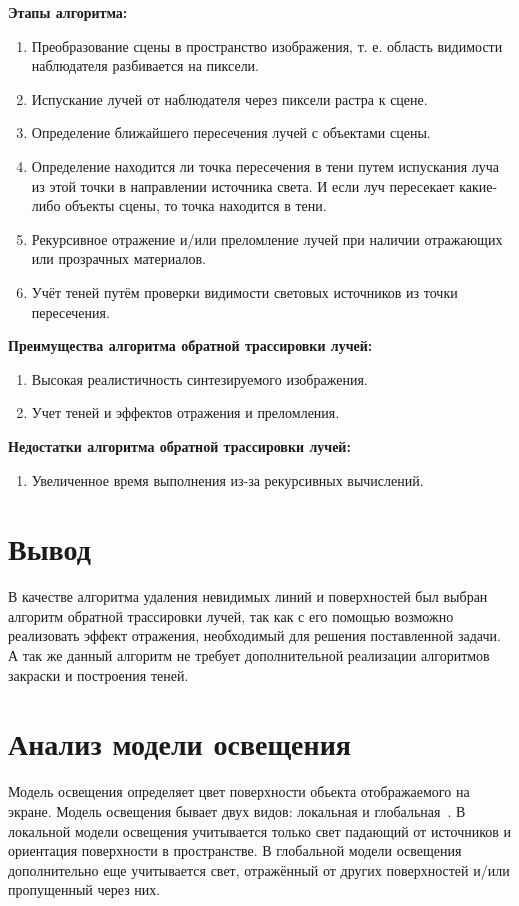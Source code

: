 \textbf{Этапы алгоритма:}
\begin{enumerate}[label=\arabic*)]
	\item Преобразование сцены в пространство изображения, т. е. область видимости наблюдателя разбивается на пиксели.
	\item Испускание лучей от наблюдателя через пиксели растра к сцене.
	\item Определение ближайшего пересечения лучей с объектами сцены.
	\item Определение находится ли точка пересечения в тени путем испускания луча из этой точки в направлении источника света. И если луч пересекает какие-либо объекты сцены, то точка находится в тени.
	\item Рекурсивное отражение и/или преломление лучей при наличии отражающих или прозрачных материалов.
	\item Учёт теней путём проверки видимости световых источников из точки пересечения.
\end{enumerate}

\textbf{Преимущества алгоритма обратной трассировки лучей:}
\begin{enumerate}[label=\arabic*)]
	\item Высокая реалистичность синтезируемого изображения.
	\item Учет теней и эффектов отражения и преломления.
\end{enumerate}

\textbf{Недостатки алгоритма обратной трассировки лучей:}
\begin{enumerate}[label=\arabic*)]
	\item Увеличенное время выполнения из-за рекурсивных вычислений.
\end{enumerate}

\section*{Вывод}
В качестве алгоритма удаления невидимых линий и поверхностей был выбран алгоритм обратной трассировки лучей, так как с его помощью возможно реализовать эффект отражения, необходимый для решения поставленной задачи. А так же данный алгоритм не требует дополнительной реализации алгоритмов закраски и построения теней.

\clearpage
\section{Анализ модели освещения}
Модель освещения определяет цвет поверхности обьекта отображаемого на экране. Модель освещения бывает двух видов: локальная и глобальная~\cite{rodgersCG}. В локальной модели освещения учитывается только свет падающий от источников и ориентация поверхности в пространстве. В глобальной модели освещения дополнительно еще учитывается свет, отражённый от других поверхностей и/или пропущенный через них.

